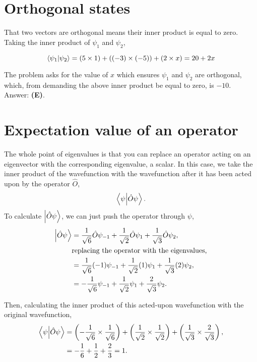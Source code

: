 \documentclass[11pt]{paper}
\newcommand{\answer}[1]{Answer: \textbf{(#1)}.}
\begin{document}
\section{Orthogonal states}
That two vectors are orthogonal means their inner product is equal to zero.  Taking the inner product of $\psi_1$ and $\psi_2$,

\begin{equation}
\bra{\psi_1}\ket{\psi_2} = (5 \times 1) + ((-3) \times (-5)) + (2 \times x) = 20+2x
\end{equation}

The problem asks for the value of $x$ which ensures $\psi_1$ and $\psi_2$ are orthogonal, which, from demanding the above inner product be equal to zero, is $-10$.\\

\answer{E}

\section{Expectation value of an operator}
The whole point of eigenvalues is that you can replace an operator acting on an eigenvector with the corresponding eigenvalue, a scalar.  In this case, we take the inner product of the wavefunction with the wavefunction after it has been acted upon by the operator $\hat{O}$,
\begin{equation}
\bra{\psi}\ket{ \hat{O} \psi}.
\end{equation}
To calculate $\ket{\hat{O} \psi}$, we can just push the operator through $\psi$,
\begin{align}
\ket{\hat{O} \psi} &= \frac{1}{\sqrt{6}} \hat{O} \psi_{-1} + \frac{1}{\sqrt{2}} \hat{O} \psi_{1} + \frac{1}{\sqrt{3}} \hat{O} \psi_{2},\\
&\text{replacing the operator with the eigenvalues,}\\
&= \frac{1}{\sqrt{6}} (-1)  \psi_{-1} + \frac{1}{\sqrt{2}} (1)  \psi_{1}+ \frac{1}{\sqrt{3}} (2)  \psi_{2},\\
&= -\frac{1}{\sqrt{6}} \psi_{-1} + \frac{1}{\sqrt{2}}  \psi_{1}+ \frac{2}{\sqrt{3}}\psi_{2}.
\end{align}

Then, calculating the inner product of this acted-upon wavefunction with the original wavefunction,
\begin{align}
\bra{\psi}\ket{ \hat{O} \psi} &= \left(-\frac{1}{\sqrt{6}} \times \frac{1}{\sqrt{6}}\right) + \left(\frac{1}{\sqrt{2}}  \times \frac{1}{\sqrt{2}} \right) + \left(\frac{1}{\sqrt{3}} \times \frac{2}{\sqrt{3}}\right),\\
&= -\frac{1}{6} + \frac{1}{2}+ \frac{2}{3} = 1.
\end{align}
\end{document}
